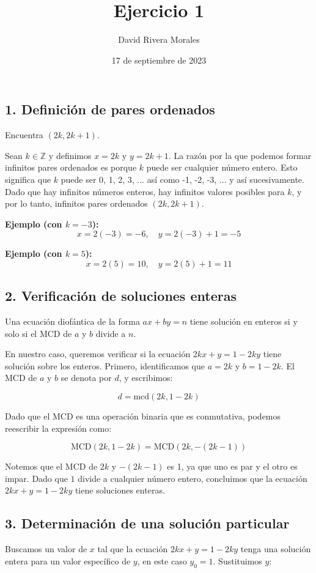 \documentclass[12pt,a4paper]{article}
\author{David Rivera Morales}
\title{Ejercicio 1}
\date{17 de septiembre de 2023}
\begin{document}
\maketitle
\subsection*{1. Definición de pares ordenados}
Encuentra \( (2k, 2k + 1) \).

Sean \( k \in \mathbb{Z} \) y definimos \( x = 2k \) y \( y = 2k + 1 \). La razón por la que podemos formar infinitos pares ordenados es porque \( k \) puede ser cualquier número entero. Esto significa que \( k \) puede ser 0, 1, 2, 3, ... así como -1, -2, -3, ... y así sucesivamente. Dado que hay infinitos números enteros, hay infinitos valores posibles para \( k \), y por lo tanto, infinitos pares ordenados \( (2k, 2k + 1) \).

\textbf{Ejemplo (con \( k = -3 \)):}
\[
x = 2(-3) = -6, \quad y = 2(-3) + 1 = -5
\]

\textbf{Ejemplo (con \( k = 5 \)):}
\[
x = 2(5) = 10, \quad y = 2(5) + 1 = 11
\]


\subsection*{2. Verificación de soluciones enteras}
Una ecuación diofántica de la forma \( ax + by = n \) tiene solución en enteros si y solo si el MCD de \( a \) y \( b \) divide a \( n \).

En nuestro caso, queremos verificar si la ecuación \( 2kx + y = 1-2ky \) tiene solución sobre los enteros. Primero, identificamos que \( a = 2k \) y \( b = 1-2k \). El MCD de \( a \) y \( b \) se denota por \( d \), y escribimos:

\[
d = \text{mcd}(2k,1-2k)
\]

Dado que el MCD es una operación binaria que es conmutativa, podemos reescribir la expresión como:

\[
\text{MCD}(2k,1-2k) = \text{MCD}(2k,-(2k-1))
\]

Notemos que el MCD de \( 2k \) y \( -(2k-1) \) es 1, ya que uno es par y el otro es impar. Dado que \( 1 \) divide a cualquier número entero, concluimos que la ecuación \( 2kx+y=1-2ky \) tiene soluciones enteras.

\subsection*{3. Determinación de una solución particular}
Buscamos un valor de \( x \) tal que la ecuación \( 2kx + y = 1-2ky \) tenga una solución entera para un valor específico de \( y \), en este caso \( y_0 = 1 \). Sustituimos \( y \):
\end{document}
